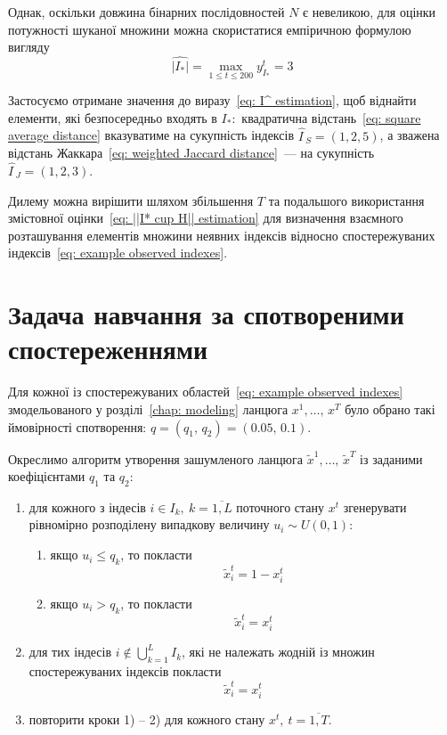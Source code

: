 Однак, оскільки довжина бінарних послідовностей $N$ є невеликою, для оцінки потужності шуканої множини можна скористатися емпіричною формулою вигляду
\begin{equation*}
    \widehat{|I_*|}=\max\limits_{1\leqslant t \leqslant 200} y^t_{I_*} = 3
\end{equation*}

\newpage
Застосуємо отримане значення до виразу~\eqref{eq: I^ estimation}, щоб віднайти елементи, які безпосередньо входять в $I_*:$ квадратична відстань~\eqref{eq: square average distance} вказуватиме на сукупність індексів $\widehat{I\,}_S=(1,2,5)$, а зважена відстань Жаккара~\eqref{eq: weighted Jaccard distance}~--- на сукупність $\widehat{I\,}_J=(1,2,3)$.

Дилему можна вирішити шляхом збільшення $T$ та подальшого використання змістовної оцінки~\eqref{eq: ||I* cup H|| estimation} для визначення взаємного розташування елементів множини неявних індексів відносно спостережуваних індексів~\eqref{eq: example observed indexes}.

\section{Задача навчання за спотвореними спостереженнями}

Для кожної із спостережуваних областей~\eqref{eq: example observed indexes} змодельованого у розділі~\ref{chap: modeling} ланцюга $x^1,\ldots,\,x^T$ було обрано такі ймовірності спотворення: $q = (q_1,\,q_2) = (0.05,\,0.1)$. 

Окреслимо алгоритм утворення зашумленого ланцюга $\widetilde{x}^1,\ldots,\,\widetilde{x}^T$ із заданими коефіцієнтами $q_1$ та $q_2:$

\begin{enumerate}
    \item для кожного з індесів $i \in I_k,\ k=\overline{1,L}$ поточного стану $x^t$ згенерувати рівномірно розподілену випадкову величину $u_i \sim U(0,1):$
    \begin{enumerate}
        \item якщо $u_i \leqslant q_k$, то покласти
        \begin{equation*}
            \widetilde{x}^{t}_i=1 - x^{t}_i
        \end{equation*} 
        \item якщо $u_i > q_k$, то покласти
        \begin{equation*}
            \widetilde{x}^{t}_i=x^{t}_i
        \end{equation*} 
    \end{enumerate}
    \item для тих індесів $i \notin \bigcup\limits_{k=1}^L I_k$, які не належать жодній із множин спостережуваних індексів покласти
    \begin{equation*}
        \widetilde{x}^{t}_i=x^{t}_i
    \end{equation*}
    \item повторити кроки 1) -- 2) для кожного стану $x^t,\ t=\overline{1,T}$.
\end{enumerate}


